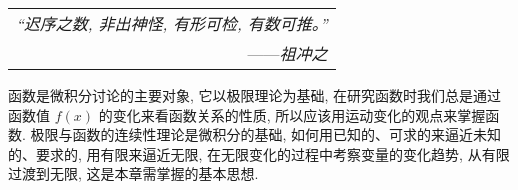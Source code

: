 \begin{flushright}
    \begin{tabular}{r|}
        \textit{“迟序之数, 非出神怪, 有形可检, 有数可推。”}\\
        ——\textit{祖冲之}
    \end{tabular}
\end{flushright}

函数是微积分讨论的主要对象, 它以极限理论为基础, 在研究函数时我们总是通过函数值 $f(x)$
的变化来看函数关系的性质, 所以应该用运动变化的观点来掌握函数.
极限与函数的连续性理论是微积分的基础, 如何用已知的、可求的来逼近未知的、要求的, 
用有限来逼近无限, 在无限变化的过程中考察变量的变化趋势, 从有限过渡到无限, 这是本章需掌握的基本思想.
